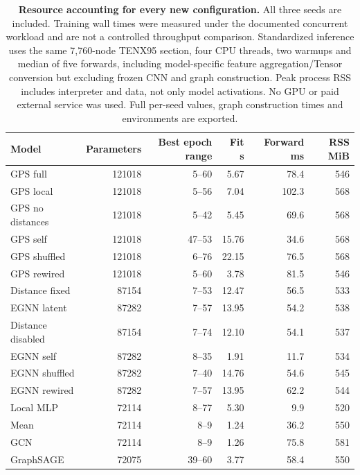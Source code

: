 \begin{table}[!htbp]
\caption{\textbf{Resource accounting for every new configuration.} All three seeds are included. Training wall times were measured under the documented concurrent workload and are not a controlled throughput comparison. Standardized inference uses the same 7,760-node TENX95 section, four CPU threads, two warmups and median of five forwards, including model-specific feature aggregation/Tensor conversion but excluding frozen CNN and graph construction. Peak process RSS includes interpreter and data, not only model activations. No GPU or paid external service was used. Full per-seed values, graph construction times and environments are exported.}
\label{tab:extension_resources}
\centering\footnotesize
\begin{tabular}{@{}lrrrrr@{}}
\toprule
Model & Parameters & Best epoch range & Fit s & Forward ms & RSS MiB \\
\midrule
GPS full & 121018 & 5--60 & 5.67 & 78.4 & 546 \\
GPS local & 121018 & 5--56 & 7.04 & 102.3 & 568 \\
GPS no distances & 121018 & 5--42 & 5.45 & 69.6 & 568 \\
GPS self & 121018 & 47--53 & 15.76 & 34.6 & 568 \\
GPS shuffled & 121018 & 6--76 & 22.15 & 76.5 & 568 \\
GPS rewired & 121018 & 5--60 & 3.78 & 81.5 & 546 \\
Distance fixed & 87154 & 7--53 & 12.47 & 56.5 & 533 \\
EGNN latent & 87282 & 7--57 & 13.95 & 54.2 & 538 \\
Distance disabled & 87154 & 7--74 & 12.10 & 54.1 & 537 \\
EGNN self & 87282 & 8--35 & 1.91 & 11.7 & 534 \\
EGNN shuffled & 87282 & 7--40 & 14.76 & 54.6 & 545 \\
EGNN rewired & 87282 & 7--57 & 13.95 & 62.2 & 544 \\
Local MLP & 72114 & 8--77 & 5.30 & 9.9 & 520 \\
Mean & 72114 & 8--9 & 1.24 & 36.2 & 550 \\
GCN & 72114 & 8--9 & 1.26 & 75.8 & 581 \\
GraphSAGE & 72075 & 39--60 & 3.77 & 58.4 & 550 \\
\bottomrule
\end{tabular}
\end{table}
\FloatBarrier


